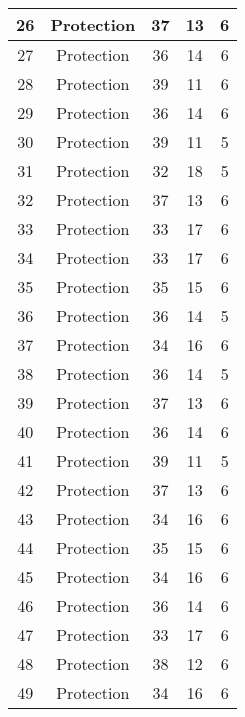 \documentclass[results.tex]{subfiles}
\begin{document}
\begin{center}
\begin{tabular}{| c || c | c | c | c |}
    \hline
    26 & Protection & 37 & 13 & 6 \\ 
    \hline
    27 & Protection & 36 & 14 & 6 \\ 
    \hline
    28 & Protection & 39 & 11 & 6 \\ 
    \hline
    29 & Protection & 36 & 14 & 6 \\ 
    \hline
    30 & Protection & 39 & 11 & 5 \\ 
    \hline
    31 & Protection & 32 & 18 & 5 \\ 
    \hline
    32 & Protection & 37 & 13 & 6 \\ 
    \hline
    33 & Protection & 33 & 17 & 6 \\ 
    \hline
    34 & Protection & 33 & 17 & 6 \\ 
    \hline
    35 & Protection & 35 & 15 & 6 \\ 
    \hline
    36 & Protection & 36 & 14 & 5 \\ 
    \hline
    37 & Protection & 34 & 16 & 6 \\ 
    \hline
    38 & Protection & 36 & 14 & 5 \\ 
    \hline
    39 & Protection & 37 & 13 & 6 \\ 
    \hline
    40 & Protection & 36 & 14 & 6 \\ 
    \hline
    41 & Protection & 39 & 11 & 5 \\ 
    \hline
    42 & Protection & 37 & 13 & 6 \\ 
    \hline
    43 & Protection & 34 & 16 & 6 \\ 
    \hline
    44 & Protection & 35 & 15 & 6 \\ 
    \hline
    45 & Protection & 34 & 16 & 6 \\ 
    \hline
    46 & Protection & 36 & 14 & 6 \\ 
    \hline
    47 & Protection & 33 & 17 & 6 \\ 
    \hline
    48 & Protection & 38 & 12 & 6 \\ 
    \hline
    49 & Protection & 34 & 16 & 6 \\ 
    \hline   \end{tabular}
\end{center}
\end{document}
